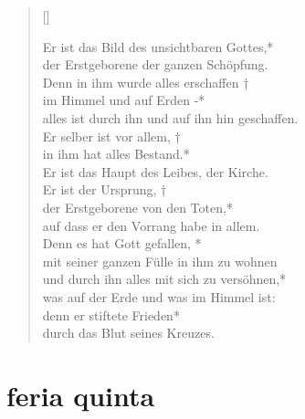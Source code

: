 \vspace{0.6cm}

\begin{verse}[\versewidth]

Er ist das Bild des unsichtbaren Gottes,*\\
der Erstgeborene der ganzen Schöpfung.\\
\vin Denn in ihm wurde alles erschaffen †\\
\vin im Himmel und auf Erden -*\\
\vin alles ist durch ihn und auf ihn hin geschaffen.\\
Er selber ist vor allem, †\\
in ihm hat alles Bestand.*\\
Er ist das Haupt des Leibes, der Kirche.\\ 
\vin Er ist der Ursprung, †\\
\vin der Erstgeborene von den Toten,*\\
\vin auf dass er den Vorrang habe in allem.\\
Denn es hat Gott gefallen, *\\
mit seiner ganzen Fülle in ihm zu wohnen\\
\vin und durch ihn alles mit sich zu versöhnen,*\\
\vin was auf der Erde und was im Himmel ist:\\
denn er stiftete Frieden*\\
durch das Blut seines Kreuzes.\\
\end{verse}


\section{feria quinta}


